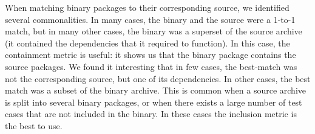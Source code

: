 When matching binary packages to their corresponding source, we identified
several commonalities. In many cases, the binary and the source were a
1-to-1 match, but in many other cases, the binary was a superset of the
source archive (it contained the dependencies that it required to
function). In this case, the containment metric is useful: it shows us that
the binary package contains the source packages.  We found it interesting
that in few cases, the best-match was not the corresponding source, but one
of its dependencies.  In other cases, the best match was a subset of the
binary archive. This is common when a source archive is split into several
binary packages, or when there exists a large number of test cases that are
not included in the binary. In these cases the inclusion metric is the best
to use.






